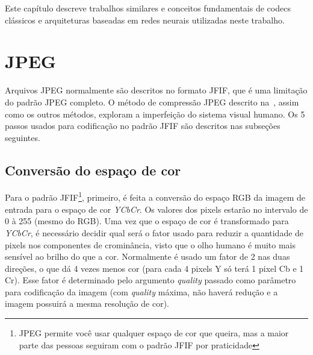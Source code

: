 \newcommand{\texCommand}[1]{\texttt{\textbackslash{#1}}}%

\newcommand{\exemplo}[1]{%
\vspace{\baselineskip}%
\noindent\fbox{\begin{minipage}{\textwidth}#1\end{minipage}}%
\\\vspace{\baselineskip}}%

\newcommand{\exemploVerbatim}[1]{%
\vspace{\baselineskip}%
\noindent\fbox{\begin{minipage}{\textwidth}%
#1\end{minipage}}%
\\\vspace{\baselineskip}}%

Este capítulo descreve trabalhos similares e conceitos fundamentais de codecs clássicos e arquiteturas baseadas em redes neurais
utilizadas neste trabalho.
\section{JPEG}
Arquivos JPEG normalmente são descritos no formato \acrshort{JFIF}, que é uma limitação do padrão JPEG completo. 
O método de compressão JPEG descrito na~, assim como os outros métodos, exploram a 
imperfeição do sistema visual humano. Os 5 passos usados para codificação no padrão JFIF são descritos nas subseções seguintes.
\subsection{Conversão do espaço de cor}
Para o padrão \acrshort{JFIF}\footnote{JPEG permite você usar qualquer espaço de cor que queira, mas a maior parte das pessoas seguiram com o padrão \acrshort{JFIF} por praticidade}, primeiro, é feita a conversão do espaço RGB da imagem de entrada para o espaço de cor \textit{YCbCr}. Os valores dos pixels estarão no intervalo de 0 à 255 (mesmo do RGB).
Uma vez que o espaço de cor é transformado para \textit{YCbCr}, é necessário decidir qual será o fator usado para reduzir a quantidade de pixels nos componentes de crominância, visto que o olho humano é muito mais sensível ao brilho do que a cor. Normalmente é usado um fator de 2 nas duas direções, o que dá 4 vezes menos cor (para cada 4 pixels Y só terá 1 pixel Cb e 1 Cr). Esse fator é determinado pelo argumento \textit{quality} passado como parâmetro para codificação da imagem (com \textit{quality} máxima, não haverá redução e a imagem possuirá a mesma resolução de cor).

